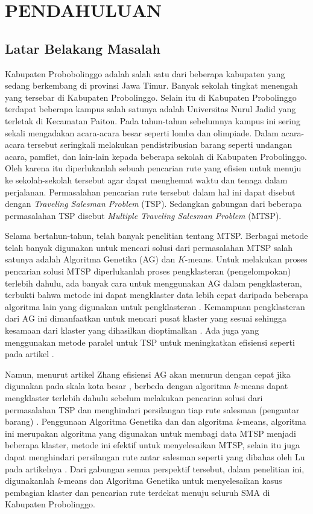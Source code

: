 \chapter{PENDAHULUAN}

\section{Latar Belakang Masalah}

Kabupaten Probobolinggo adalah salah satu dari beberapa kabupaten yang sedang berkembang di provinsi Jawa Timur. Banyak sekolah tingkat menengah yang tersebar di Kabupaten Probolinggo. Selain itu di Kabupaten Probolinggo terdapat beberapa kampus salah satunya adalah Universitas Nurul Jadid yang terletak di Kecamatan Paiton. Pada tahun-tahun sebelumnya kampus ini sering sekali mengadakan acara-acara besar seperti lomba dan olimpiade. Dalam acara-acara tersebut seringkali melakukan pendistribusian barang seperti undangan acara, pamflet, dan lain-lain kepada beberapa sekolah di Kabupaten Probolinggo. Oleh karena itu diperlukanlah sebuah pencarian rute yang efisien untuk menuju ke sekolah-sekolah tersebut agar dapat menghemat waktu dan tenaga dalam perjalanan. Permasalahan pencarian rute tersebut dalam hal ini dapat disebut dengan \textit{Traveling Salesman Problem} (TSP). Sedangkan gabungan dari beberapa permasalahan TSP disebut \textit{Multiple Traveling Salesman Problem} (MTSP).

Selama bertahun-tahun, telah banyak penelitian tentang MTSP. Berbagai metode telah banyak digunakan untuk mencari solusi dari permasalahan MTSP salah satunya adalah Algoritma Genetika (AG) dan $K$-means. Untuk melakukan proses pencarian solusi MTSP diperlukanlah proses pengklasteran (pengelompokan) terlebih dahulu, ada banyak cara untuk menggunakan AG dalam pengklasteran, terbukti bahwa metode ini dapat mengklaster data lebih cepat daripada beberapa algoritma lain yang digunakan untuk pengklasteran \cite{krishna1999genetic}. Kemampuan pengklasteran dari AG ini dimanfaatkan untuk mencari pusat klaster yang sesuai sehingga kesamaan dari klaster yang dihasilkan dioptimalkan \cite{maii2000genetic}. Ada juga yang menggunakan metode paralel untuk TSP untuk meningkatkan efisiensi seperti pada artikel \cite{li2016parallel}.

Namun, menurut artikel Zhang efisiensi AG akan menurun dengan cepat jika digunakan pada skala kota besar \cite{zhang2014parallel}, berbeda dengan algoritma $k$-means dapat mengklaster terlebih dahulu sebelum melakukan pencarian solusi dari permasalahan TSP dan menghindari persilangan tiap rute salesman (pengantar barang) \cite{inproceedings}. Penggunaan Algoritma Genetika dan dan algoritma \textit{k}-means, algoritma ini merupakan algoritma yang digunakan untuk membagi data MTSP menjadi beberapa klaster, metode ini efektif untuk menyelesaikan MTSP, selain itu juga dapat menghindari persilangan rute antar salesman seperti yang dibahas oleh Lu pada artikelnya \cite{inproceedings}. Dari gabungan semua perspektif tersebut, dalam penelitian ini, digunakanlah \textit{k}-means dan Algoritma Genetika untuk menyelesaikan kasus pembagian klaster dan pencarian rute terdekat menuju seluruh SMA di Kabupaten Probolinggo.

